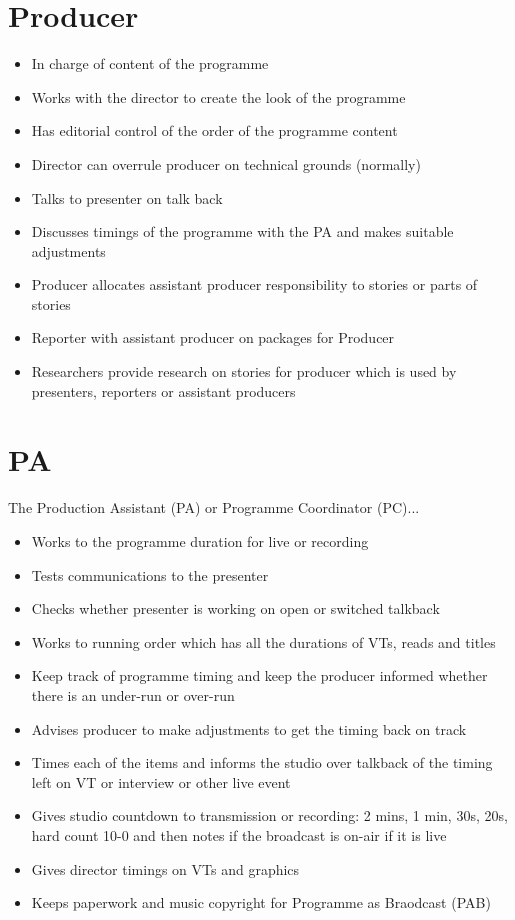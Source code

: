 \documentclass[7pt,a5paper]{book}
\begin{document}
\newpage
\section{Producer}
% 
\begin{itemize}
    \item In charge of content of the programme
    \item Works with the director to create the look of the programme
    \item Has editorial control of the order of the programme content
    \item Director can overrule producer on technical grounds (normally)
    \item Talks to presenter on talk back
    \item Discusses timings of the programme with the PA and makes suitable adjustments
    \item Producer allocates assistant producer responsibility to stories or parts of stories
    \item Reporter with assistant producer on packages for Producer
    \item Researchers provide research on stories for producer which is used by presenters, reporters or assistant producers
\end{itemize}

\newpage
\section{PA}
The Production Assistant (PA) or Programme Coordinator (PC)...
\begin{itemize}
    \item Works to the programme duration for live or recording
    \item Tests communications to the presenter
    \item Checks whether presenter is working on open or switched talkback
    \item Works to running order which has all the durations of VTs, reads and titles
    \item Keep track of programme timing and keep the producer informed whether there is an under-run or over-run
    \item Advises producer to make adjustments to get the timing back on track
    \item Times each of the items and informs the studio over talkback of the timing left on VT or interview or other live event
    \item Gives studio countdown to transmission or recording: 2 mins, 1 min, 30s, 20s, hard count 10-0 and then notes if the broadcast is on-air if it is live
    \item Gives director timings on VTs and graphics
    \item Keeps paperwork and music copyright for Programme as Braodcast (PAB)
\end{itemize}
\end{document}
